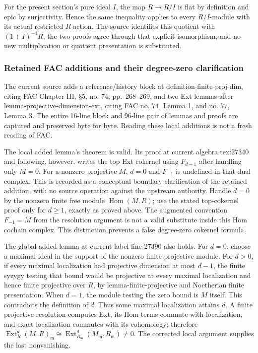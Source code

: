 For the present section's pure ideal \(I\), the map \(R\to R/I\) is flat by definition and epic by surjectivity. Hence the same inequality applies to every \(R/I\)-module with its actual restricted \(R\)-action. The source identifies this quotient with \((1+I)^{-1}R\); the two proofs agree through that explicit isomorphism, and no new multiplication or quotient presentation is substituted.

\subsubsection{Retained FAC additions and their degree-zero clarification}\label{algebra-proof-022-retained-fac-additions-and-their-degree-zero-clarification}

The current source adds a reference/history block at definition-finite-proj-dim, citing FAC Chapter III, §5, no. 74, pp.~268--269, and two Ext lemmas after lemma-projective-dimension-ext, citing FAC no. 74, Lemma 1, and no. 77, Lemma 3. The entire 16-line block and 96-line pair of lemmas and proofs are captured and preserved byte for byte. Reading these local additions is not a fresh reading of FAC.

The local added lemma's theorem is valid. Its proof at current algebra.tex:27340 and following, however, writes the top Ext cokernel using \(F_{d-1}\) after handling only \(M=0\). For a nonzero projective \(M\), \(d=0\) and \(F_{-1}\) is undefined in that dual complex. This is recorded as a conceptual boundary clarification of the retained addition, with no source operation against the upstream authority. Handle \(d=0\) by the nonzero finite free module \(\operatorname{Hom}(M,R)\); use the stated top-cokernel proof only for \(d\ge1\), exactly as proved above. The augmented convention \(F_{-1}=M\) from the resolution argument is not a valid substitute inside this Hom cochain complex. This distinction prevents a false degree-zero cokernel formula.

The global added lemma at current label line 27390 also holds. For \(d=0\), choose a maximal ideal in the support of the nonzero finite projective module. For \(d>0\), if every maximal localization had projective dimension at most \(d-1\), the finite syzygy testing that bound would be projective at every maximal localization and hence finite projective over \(R\), by lemma-finite-projective and Noetherian finite presentation. When \(d=1\), the module testing the zero bound is \(M\) itself. This contradicts the definition of \(d\). Thus some maximal localization attains \(d\). A finite projective resolution computes Ext, its Hom terms commute with localization, and exact localization commutes with its cohomology; therefore \(\operatorname{Ext}^d_R(M,R)_{\mathfrak m}
\cong\operatorname{Ext}^d_{R_{\mathfrak m}}(M_{\mathfrak m},R_{\mathfrak m})\ne0\). The corrected local argument supplies the last nonvanishing.

